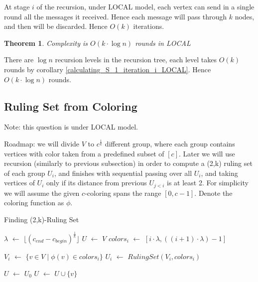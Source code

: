 \documentclass[11pt]{article}
\newcommand*\Let[2]{\State #1 $\gets$ #2}
\newtheorem{theorem}{Theorem}[section]
\begin{document}
At stage $i$ of the recursion, under LOCAL model, each vertex can send in a single round all the messages it received. Hence each message will pass through $k$ nodes, and then will be discarded. Hence $O(k)$ iterations.

\begin{theorem}
\label{Complexity_2_1_local}
Complexity is $O(k \cdot \log{n})$ rounds in LOCAL
\end{theorem}
There are $\log{n}$ recursion levels in the recursion tree, each level takes $O(k)$ rounds by corollary \ref{calculating_S_1_iteration_i_LOCAL}. Hence $O(k \cdot \log{n})$ rounds.

\newpage
\subsection{Ruling Set from Coloring}
Note: this question is under LOCAL model.

Roadmap: we will divide $V$ to $c^{\frac{1}{k}}$ different group, where each group contains vertices with color taken from a predefined subset of $[c]$. Later we will use recursion (similarly to previous subsection) in order to compute a (2,k) ruling set of each group $U_i$, and finishes with sequential passing over all $U_i$, and taking vertices of $U_i$ only if its distance from previous $U_{j< i}$ is at least 2.
For simplicity we will assume the given $c$-coloring spans the range $[0, c-1]$.
Denote the coloring function as $\phi$.

\begin{algorithm}
  \caption{Finding (2,k)-Ruling Set}
  \begin{algorithmic}[1]
    \Statex
        \Let{$\lambda$}{$\lfloor(c_{end} - c_{begin})^{\frac{1}{k}}\rfloor$}
         
            \Let{$U$}{$V$}
        \Else
            \Let{$colors_i$}{$[i \cdot \lambda, ((i+1) \cdot \lambda ) - 1]$} 
            
            \Let{$V_i$}{$ \{ v \in V \mid \phi(v) \in colors_{i} \} $}
            \Let{$U_i$}{$RulingSet(V_i, colors_i)$} 
            
            \Let{$U$}{$U_0$}
                 
                        \Let{$U$}{$U \cup \{ v\}$}
                    \EndIf
                \EndFor
            \EndFor
            
        \EndIf
        
    \EndFunction
  \end{algorithmic}
\end{algorithm}
\end{document}
